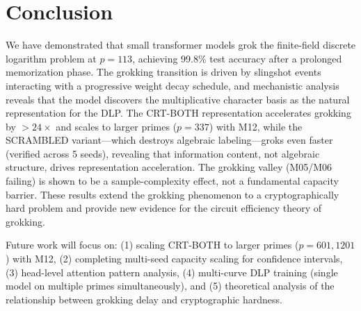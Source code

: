 \documentclass[11pt]{article}
\begin{document}

\section{Conclusion}
\label{sec:conclusion}

We have demonstrated that small transformer models grok the finite-field discrete logarithm problem at $p = 113$, achieving 99.8\% test accuracy after a prolonged memorization phase. The grokking transition is driven by slingshot events interacting with a progressive weight decay schedule, and mechanistic analysis reveals that the model discovers the multiplicative character basis as the natural representation for the DLP. The CRT-BOTH representation accelerates grokking by $>24\times$ and scales to larger primes ($p = 337$) with M12, while the SCRAMBLED variant---which destroys algebraic labeling---groks even faster (verified across 5 seeds), revealing that information content, not algebraic structure, drives representation acceleration. The grokking valley (M05/M06 failing) is shown to be a sample-complexity effect, not a fundamental capacity barrier. These results extend the grokking phenomenon to a cryptographically hard problem and provide new evidence for the circuit efficiency theory of grokking.

Future work will focus on: (1) scaling CRT-BOTH to larger primes ($p = 601, 1201$) with M12, (2) completing multi-seed capacity scaling for confidence intervals, (3) head-level attention pattern analysis, (4) multi-curve DLP training (single model on multiple primes simultaneously), and (5) theoretical analysis of the relationship between grokking delay and cryptographic hardness.





\end{document}
